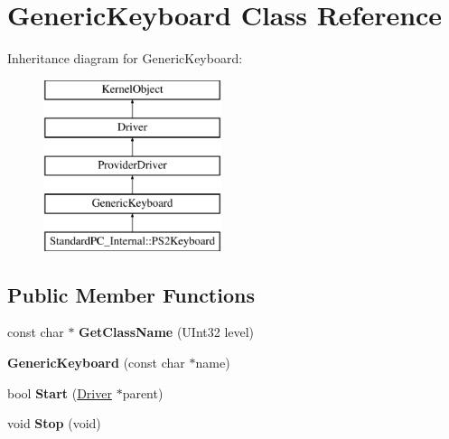 \hypertarget{class_generic_keyboard}{}\section{Generic\+Keyboard Class Reference}
\label{class_generic_keyboard}
Inheritance diagram for Generic\+Keyboard\+:\begin{figure}[H]
\begin{center}
\leavevmode
\includegraphics[height=5.000000cm]{class_generic_keyboard}
\end{center}
\end{figure}
\subsection*{Public Member Functions}
\begin{DoxyCompactItemize}
\item 
\mbox{\label{class_generic_keyboard_ada61b732d8ef64c5a506896f4fbeee87}} 
const char $\ast$ {\bfseries Get\+Class\+Name} (U\+Int32 level)
\item 
\mbox{\label{class_generic_keyboard_a3df84388c4aca9eb633d259f6cf670ed}} 
{\bfseries Generic\+Keyboard} (const char $\ast$name)
\item 
\mbox{\label{class_generic_keyboard_a437887f81eb3507c4e9775127040eb26}} 
bool {\bfseries Start} (\hyperlink{class_driver}{Driver} $\ast$parent)
\item 
\mbox{\label{class_generic_keyboard_acc9f38c7e0a6a3d1adf545fdddd31388}} 
void {\bfseries Stop} (void)
\end{DoxyCompactItemize}
